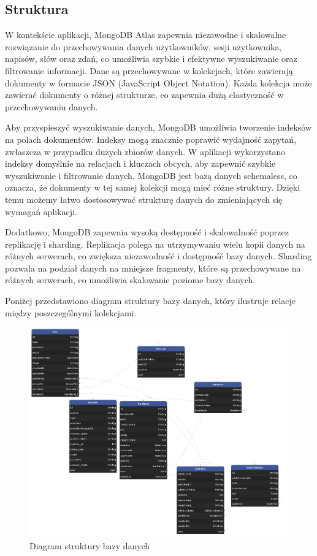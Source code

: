 \subsection{Struktura}
W kontekście aplikacji, MongoDB Atlas zapewnia niezawodne i skalowalne rozwiązanie do przechowywania danych użytkowników, sesji użytkownika, napisów, słów oraz zdań, co umożliwia szybkie i efektywne wyszukiwanie oraz filtrowanie informacji. Dane są przechowywane w kolekcjach, które zawierają dokumenty w formacie JSON (JavaScript Object Notation). Każda kolekcja może zawierać dokumenty o różnej strukturze, co zapewnia dużą elastyczność w przechowywaniu danych.

Aby przyspieszyć wyszukiwanie danych, MongoDB umożliwia tworzenie indeksów na polach dokumentów. Indeksy mogą znacznie poprawić wydajność zapytań, zwłaszcza w przypadku dużych zbiorów danych. W aplikacji wykorzystano indeksy domyślnie na relacjach i kluczach obcych, aby zapewnić szybkie wyszukiwanie i filtrowanie danych.
MongoDB jest bazą danych schemaless, co oznacza, że dokumenty w tej samej kolekcji mogą mieć różne struktury. Dzięki temu możemy łatwo dostosowywać strukturę danych do zmieniających się wymagań aplikacji.

Dodatkowo, MongoDB zapewnia wysoką dostępność i skalowalność poprzez replikację i sharding. Replikacja polega na utrzymywaniu wielu kopii danych na różnych serwerach, co zwiększa niezawodność i dostępność bazy danych. Sharding pozwala na podział danych na mniejsze fragmenty, które są przechowywane na różnych serwerach, co umożliwia skalowanie poziome bazy danych.

Poniżej przedstawiono diagram struktury bazy danych, który ilustruje relacje między poszczególnymi kolekcjami.
\begin{figure}[H]
    \centering
    \includegraphics[width=1\textwidth]{IMAGE/DatabaseDiagram.png}
    \caption{Diagram struktury bazy danych}
    \label{fig:StrukturaBazyDanych}
\end{figure}
